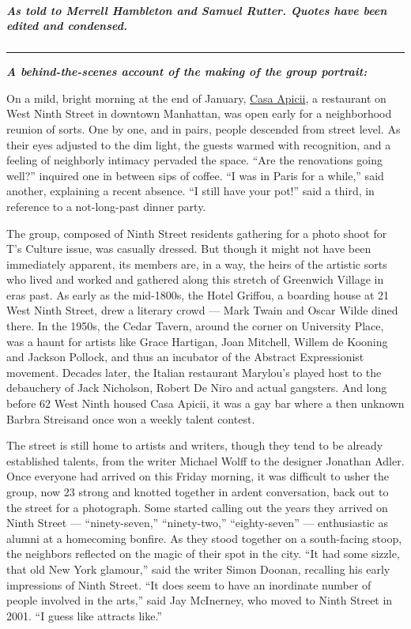 \hypertarget{as-told-to-merrell-hambleton-and-samuel-rutter-quotes-have-been-edited-and-condensed}{%
\subparagraph{As told to Merrell Hambleton and Samuel Rutter. Quotes
have been edited and
condensed.}\label{as-told-to-merrell-hambleton-and-samuel-rutter-quotes-have-been-edited-and-condensed}}

\begin{center}\rule{0.5\linewidth}{\linethickness}\end{center}

\emph{\textbf{A behind-the-scenes account of the making of the group
portrait:}}

On a mild, bright morning at the end of January,
\href{http://www.casaapicii.com/}{Casa Apicii}, a restaurant on West
Ninth Street in downtown Manhattan, was open early for a neighborhood
reunion of sorts. One by one, and in pairs, people descended from street
level. As their eyes adjusted to the dim light, the guests warmed with
recognition, and a feeling of neighborly intimacy pervaded the space.
``Are the renovations going well?'' inquired one in between sips of
coffee. ``I was in Paris for a while,'' said another, explaining a
recent absence. ``I still have your pot!'' said a third, in reference to
a not-long-past dinner party.

The group, composed of Ninth Street residents gathering for a photo
shoot for T's Culture issue, was casually dressed. But though it might
not have been immediately apparent, its members are, in a way, the heirs
of the artistic sorts who lived and worked and gathered along this
stretch of Greenwich Village in eras past. As early as the mid-1800s,
the Hotel Griffou, a boarding house at 21 West Ninth Street, drew a
literary crowd --- Mark Twain and Oscar Wilde dined there. In the 1950s,
the Cedar Tavern, around the corner on University Place, was a haunt for
artists like Grace Hartigan, Joan Mitchell, Willem de Kooning and
Jackson Pollock, and thus an incubator of the Abstract Expressionist
movement. Decades later, the Italian restaurant Marylou's played host to
the debauchery of Jack Nicholson, Robert De Niro and actual gangsters.
And long before 62 West Ninth housed Casa Apicii, it was a gay bar where
a then unknown Barbra Streisand once won a weekly talent contest.

The street is still home to artists and writers, though they tend to be
already established talents, from the writer Michael Wolff to the
designer Jonathan Adler. Once everyone had arrived on this Friday
morning, it was difficult to usher the group, now 23 strong and knotted
together in ardent conversation, back out to the street for a
photograph. Some started calling out the years they arrived on Ninth
Street --- ``ninety-seven,'' ``ninety-two,'' ``eighty-seven'' ---
enthusiastic as alumni at a homecoming bonfire. As they stood together
on a south-facing stoop, the neighbors reflected on the magic of their
spot in the city. ``It had some sizzle, that old New York glamour,''
said the writer Simon Doonan, recalling his early impressions of Ninth
Street. ``It does seem to have an inordinate number of people involved
in the arts,'' said Jay McInerney, who moved to Ninth Street in 2001.
``I guess like attracts like.''

